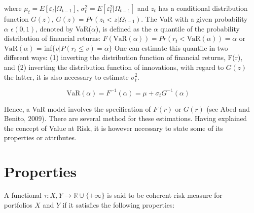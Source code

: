 \documentclass[a4paper,11pt,oneside]{book}
\begin{document}
where $\mu_t= E[\varepsilon_t|\Omega_{t-1}]$, $\sigma^2_t = E[\varepsilon^2_t|\Omega_{t-1}]$ and $z_t$ has a conditional distribution function $G(z)$, $G(z) = Pr(z_t < z|\Omega_{t-1})$. The VaR with a given probability $\alpha$ $\epsilon(0,1)$, denoted by VaR($\alpha$), is defined as the $\alpha$ quantile of the probability distribution of financial returns:\newline
$F(\text{VaR}(\alpha))=Pr(r_t < \text{VaR}(\alpha))=\alpha$ or $\text{VaR}(\alpha)$ = inf$\{v|P(r_t \leq v)= \alpha\}$
\newline\newline
One can estimate this quantile in two different ways: (1) inverting the distribution function of financial returns, F(r), and (2)
inverting the distribution function of innovations, with regard to
$G(z)$ the latter, it is also necessary to estimate $\sigma^2_t$. 

\begin{equation}
\text{VaR} (\alpha) = F^{-1}(\alpha) = \mu + \sigma_tG^{-1}(\alpha)
\label{2}
\end{equation}

Hence, a VaR model involves the specification of $F(r)$ or $G(r)$ (see Abed and Benito, 2009). There are several method for these estimations. Having explained the concept of Value at Risk, it is however necessary to state some of its properties or attributes.



\section{Properties}

A functional $\tau: X,Y \rightarrow \mathbb{R} \cup \{+\infty\}$ is said to be coherent risk measure for portfolios $X$ and $Y$ if it satisfies the following properties:
\newline
\end{document}

